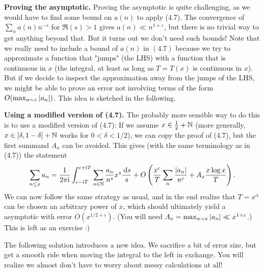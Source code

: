 \documentclass[a4paper,11pt]{article}
\begin{document}
\textbf{Proving the asymptotic.}
Proving the asymptotic is
quite challenging, as we would have to find some bound on $a(n)$ to apply (4.7).
The convergence of $\sum_n a(n)n^{-s}$ for $\Re (s)>1$ gives $a(n) \ll
n^{1+\varepsilon}$, but 
there is no trivial way to get anything beyond that.
But it turns out we don't need such bounds! Note that we really need to include
a bound of $a(n)$ in $(4.7)$ because we try to approximate a function that 
"jumps" (the LHS) with a function that is continuous in $x$ (the integral, 
at least as long as $T = T(x)$ is continuous in $x$). But if we decide to inspect
the approximation away from the jumps of the LHS, we might be able to prove an 
error not involving terms of the form $O(\max_{n \sim x} \left\lvert a_n \right\rvert)$. This 
idea is sketched in the following.

\textbf{Using a modified version of (4.7).} The probably more sensible way to
do this is to use a modified version of 
(4.7): If we assume $x \in \frac 12 + \mathbb{N}$ (more generally, $x \in 
[\delta, 1-\delta] + \mathbb{N}$ works for $0 < \delta < 1/2$),
we can copy the proof of
(4.7), but the first summand $A_x$ can be avoided. This gives (with the same
terminology as in (4.7)) the statement
\[
    \sum_{n \leq x} a_n = \frac{1}{2 \pi \mathrm i} \int_{c-\mathrm i T}^{c + \mathrm i T} \sum_{n \in
        \mathbb{N}}\frac{a_n}{n^s} x^{s} \frac {\mathrm{\,d} s}s + O\left(\frac{x^c}T \sum_n
            \frac{\left\lvert a_n \right\rvert}{n^c} + 
    A_x \frac{x \log x}T\right).
\]
We can now follow the same strategy as usual, and in the end realize
that $T = x^\alpha$ can be chosen an arbitrary power of $x$, which 
should ultimately yield a asymptotic with error $O(x^{1/2+\varepsilon})$.
(You will need $A_x = \max_{n \sim x} \left\lvert a_n \right\rvert \ll x^{1+\varepsilon}$.) This
is left as an exercise :) 

The following solution introduces a new idea. We 
sacrifice a bit of error size, but get a smooth ride when moving the integral to 
the left in exchange. You will realize we almost don't have to worry about
messy calculations at all! 
\end{document}
